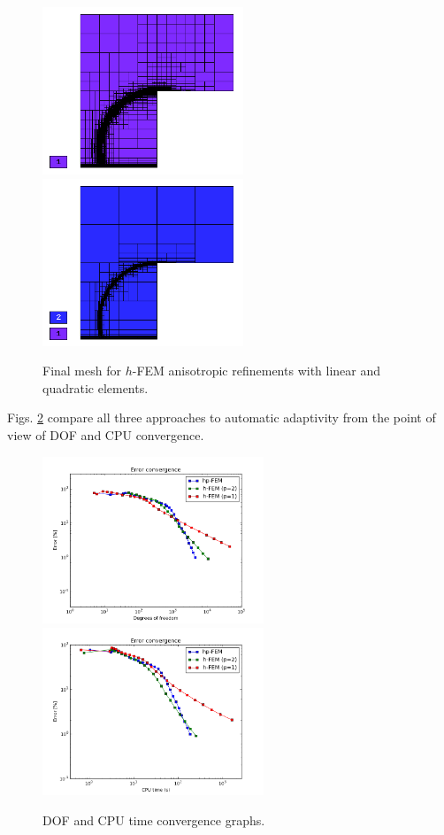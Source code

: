 \begin{figure}[!ht]
\centering
\includegraphics[height=5cm]{nist/nist-12/mesh_h1_aniso.png}\ \
\includegraphics[height=5cm]{nist/nist-12/mesh_h2_aniso.png}
\vspace{-2mm}
\caption{Final mesh for $h$-FEM anisotropic refinements with linear and quadratic elements.}
\label{fig:nist-12-h-aniso}
\end{figure}

Figs. \ref{fig:nist-12-conv} compare all
three approaches to automatic adaptivity from the point
of view of DOF and CPU convergence.

\begin{figure}[!ht]
\centering
\includegraphics[height=5cm]{nist/nist-12/conv_dof_aniso.png}\ \
\includegraphics[height=5cm]{nist/nist-12/conv_cpu_aniso.png}
\caption{DOF and CPU time convergence graphs.}
\label{fig:nist-12-conv}
\end{figure}

